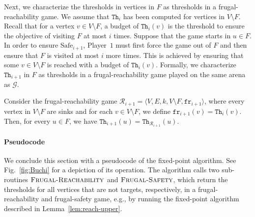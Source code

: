 \documentclass{article}\providecommand{\nequiv}{\not\equiv}\usepackage[a4paper,margin=20mm]{geometry}
\newcommand{\Call}[2]{\ProcNameSty{#1}(#2)} %
\newcommand{\Calli}[1]{\textsc{#1}} %
\newcommand{\PO}{Player~$1$\xspace}
\newcommand{\G}{{\mathcal G}}
\newcommand{\R}{{\mathcal R}}
\renewcommand{\S}{{\mathcal S}}
\newcommand{\fr}{\texttt{fr}}
\newcommand{\notF}{V \setminus F}
\newcommand{\thresh}{\texttt{Th}\xspace}
\newcommand{\safe}{\text{Safe}}
\newcommand{\zug}[1]{\langle #1  \rangle}
\begin{document}
Next, we characterize the thresholds in vertices in $F$ as thresholds in a frugal-reachability game. 
We assume that $\thresh_{i}$ has been computed for vertices in $\notF$. 
Recall that for a vertex $v \in \notF$, a budget of $\thresh_{i}(v)$ is the threshold to ensure the objective of visiting $F$ at most $i$ times. 
Suppose that the game starts in $u \in F$. 
In order to ensure $\safe_{i+1}$, \PO must first force the game out of $F$ and then ensure that $F$ is visited at most $i$ more times. This is achieved by ensuring that some $v \in \notF$ is reached with a budget of $\thresh_{i}(v)$. Formally, we characterize $\thresh_{i+1}$ in $F$ as thresholds in a frugal-reachability game played on the same arena as $\G$. 


\begin{lemma}\label{lem: frugalreachtoSafei}
	Consider the frugal-reachability game $\R_{i+1} = \zug{V, E, k, \notF, \fr_{i+1}}$, where every vertex in \(V \setminus F\) are sinks and for each $v \in \notF$, we define $\fr_{i+1}(v) = \thresh_{i}(v)$. 
	Then, for every $u \in F$, we have $\thresh_{i+1}(u) = \thresh_{\R_{i+1}}(u)$. 
\end{lemma}



\paragraph*{Pseudocode} 
We conclude this section with a pseudocode of the fixed-point algorithm. See Fig.~\ref{fig:Buchi} for a depiction of its operation. 
The algorithm calls two sub-routines $\Calli{Frugal-Reachability}$ and $\Calli{Frugal-Safety}$, which return the thresholds for all vertices that are not targets, respectively, in a frugal-reachability and frugal-safety game, e.g., by running the fixed-point algorithm described in Lemma~\ref{lem:reach-upper}.




\end{document}
